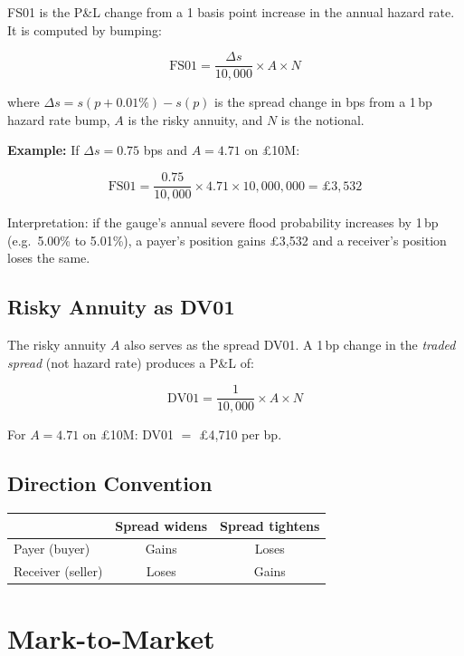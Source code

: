 \documentclass[11pt,a4paper]{article}
\begin{document}
FS01 is the P\&L change from a 1 basis point increase in the annual
hazard rate.  It is computed by bumping:

\[
  \text{FS01} = \frac{\Delta s}{10{,}000} \times A \times N
\]

\noindent where $\Delta s = s(p + 0.01\%) - s(p)$ is the spread change
in bps from a 1\,bp hazard rate bump, $A$ is the risky annuity, and
$N$ is the notional.

\textbf{Example:} If $\Delta s = 0.75$ bps and $A = 4.71$ on \pounds10M:

\[
  \text{FS01} = \frac{0.75}{10{,}000} \times 4.71 \times 10{,}000{,}000
             = \pounds3{,}532
\]

\noindent Interpretation: if the gauge's annual severe flood probability
increases by 1\,bp (e.g.\ 5.00\% to 5.01\%), a payer's position gains
\pounds3,532 and a receiver's position loses the same.

\subsection{Risky Annuity as DV01}

The risky annuity $A$ also serves as the spread DV01.  A 1\,bp change in
the \emph{traded spread} (not hazard rate) produces a P\&L of:

\[
  \text{DV01} = \frac{1}{10{,}000} \times A \times N
\]

\noindent For $A = 4.71$ on \pounds10M: DV01 $=$ \pounds4,710 per bp.

\subsection{Direction Convention}

\begin{center}
\begin{tabular}{lcc}
\toprule
& \textbf{Spread widens} & \textbf{Spread tightens} \\
\midrule
Payer (buyer)   & Gains  & Loses \\
Receiver (seller) & Loses & Gains \\
\bottomrule
\end{tabular}
\end{center}


\section{Mark-to-Market}
\end{document}
